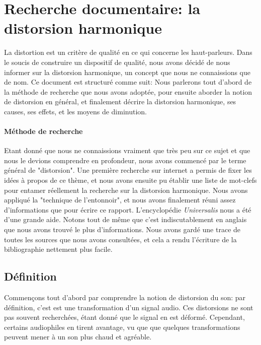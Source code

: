 \documentclass{article}
\begin{document}
\section{Recherche documentaire: la distorsion harmonique}

La distortion est un critère de qualité en ce qui concerne les haut-parleurs.
Dans le soucis de construire un dispositif de qualité, nous avons décidé de 
nous informer sur la distorsion harmonique, un concept que nous ne connaissions
que de nom.
Ce document est structuré comme suit: Nous parlerons tout d'abord de la méthode 
de recherche que nous avons adoptée, pour ensuite aborder la notion  de distorsion 
en général, et finalement décrire la distorsion harmonique, ses causes, ses effets,
et les moyens de diminution.

\paragraph{Méthode de recherche}
Etant donné que nous ne connaissions vraiment que très peu sur ce sujet et que nous 
le devions comprendre en profondeur, nous avons commencé par le terme général de "distorsion". 
Une première recherche sur internet a permis de fixer les idées à propos de ce thème, et nous 
avons ensuite pu établir une liste de mot-clefs pour entamer réellement la recherche sur la 
distorsion harmonique. Nous avons appliqué la "technique de l'entonnoir", et nous avons finalement 
réuni assez d'informations que pour écrire ce rapport. L'encyclopédie \textit{Universalis} nous a 
été d'une grande aide. Notons tout de même que c'est indiscutablement en anglais que nous avons 
trouvé le plus d'informations. Nous avons gardé une trace de toutes les sources que nous avons 
consultées, et cela a rendu l'écriture de la bibliographie nettement plus facile.

\subsection{Définition}
Commençons tout d'abord par comprendre la notion de distorsion du son: par définition, c'est est
une transformation d'un signal audio. Ces distorsions ne sont pas souvent recherchées, étant donné
que le signal en est déformé. Cependant, certains audiophiles en tirent avantage, vu que que quelques
transformations peuvent mener à un son plus chaud et agréable.
\end{document}
